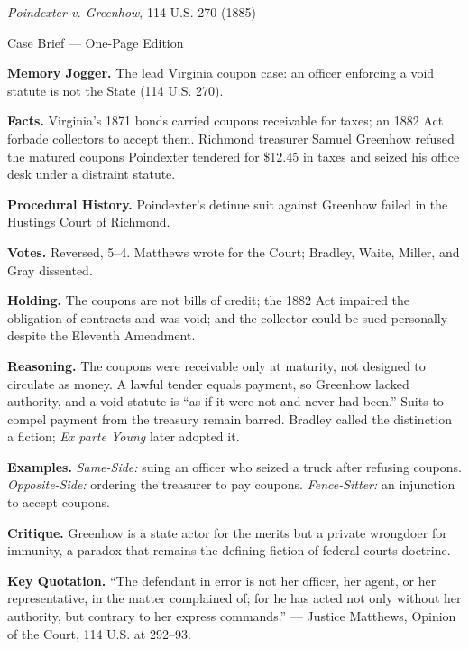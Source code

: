 \documentclass[12pt]{article}
\begin{document}
\begin{center}
{\Large \textit{Poindexter v. Greenhow}, 114 U.S. 270 (1885)\par}
\vspace{0.3em}
{\normalsize Case Brief --- One-Page Edition\par}
\end{center}

\textbf{Memory Jogger.} The lead Virginia coupon case: an officer enforcing a void statute is not the State (\href{https://supreme.justia.com/cases/federal/us/114/270/}{114 U.S. 270}).

\textbf{Facts.} Virginia's 1871 bonds carried coupons receivable for taxes; an 1882 Act forbade collectors to accept them. Richmond treasurer Samuel Greenhow refused the matured coupons Poindexter tendered for \$12.45 in taxes and seized his office desk under a distraint statute.

\textbf{Procedural History.} Poindexter's detinue suit against Greenhow failed in the Hustings Court of Richmond.

\textbf{Votes.} Reversed, 5--4. Matthews wrote for the Court; Bradley, Waite, Miller, and Gray dissented.

\textbf{Holding.} The coupons are not bills of credit; the 1882 Act impaired the obligation of contracts and was void; and the collector could be sued personally despite the Eleventh Amendment.

\textbf{Reasoning.} The coupons were receivable only at maturity, not designed to circulate as money. A lawful tender equals payment, so Greenhow lacked authority, and a void statute is ``as if it were not and never had been.'' Suits to compel payment from the treasury remain barred. Bradley called the distinction a fiction; \textit{Ex parte Young} later adopted it.

\textbf{Examples.} \emph{Same-Side:} suing an officer who seized a truck after refusing coupons. \emph{Opposite-Side:} ordering the treasurer to pay coupons. \emph{Fence-Sitter:} an injunction to accept coupons.

\textbf{Critique.} Greenhow is a state actor for the merits but a private wrongdoer for immunity, a paradox that remains the defining fiction of federal courts doctrine.

\textbf{Key Quotation.} ``The defendant in error is not her officer, her agent, or her representative, in the matter complained of; for he has acted not only without her authority, but contrary to her express commands.'' --- Justice Matthews, Opinion of the Court, 114 U.S. at 292--93.
\end{document}
